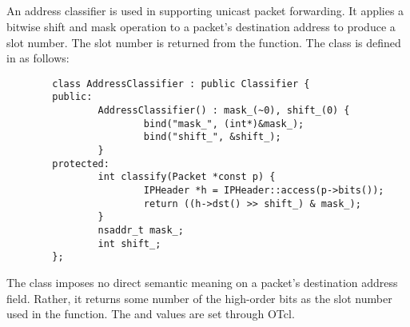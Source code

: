 \subsection{}

An address classifier is used in supporting unicast packet
forwarding.
It applies a bitwise shift and mask operation to a packet's destination
address to produce a slot number.
The slot number is returned from the  function.
The  class is defined in
 as follows:
\begin{small}
\begin{verbatim}
        class AddressClassifier : public Classifier {
        public:
                AddressClassifier() : mask_(~0), shift_(0) {
                        bind("mask_", (int*)&mask_);
                        bind("shift_", &shift_);
                }
        protected:
                int classify(Packet *const p) {
                        IPHeader *h = IPHeader::access(p->bits());
                        return ((h->dst() >> shift_) & mask_);
                }
                nsaddr_t mask_;
                int shift_;
        };
\end{verbatim}
\end{small}
The class imposes no direct semantic meaning on a packet's destination
address field.
Rather, it returns some number of the high-order bits as the slot
number used in the  function.
The  and  values are set through OTcl.

\subsection{}

